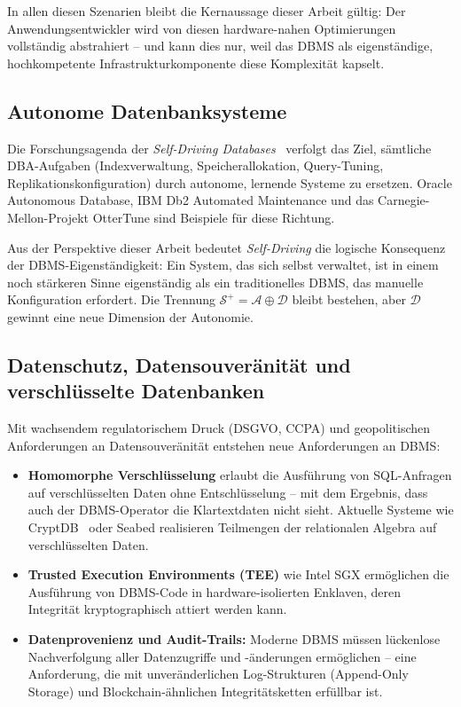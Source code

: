 ﻿\documentclass[a4paper,12pt]{article}
\theoremstyle{definition}
\begin{document}
In allen diesen Szenarien bleibt die Kernaussage dieser Arbeit gültig: Der Anwendungsentwickler wird von diesen hardware-nahen Optimierungen vollständig abstrahiert -- und kann dies nur, weil das DBMS als eigenständige, hochkompetente Infrastrukturkomponente diese Komplexität kapselt.

\subsection{Autonome Datenbanksysteme}

Die Forschungsagenda der \emph{Self-Driving Databases}~\cite{pavlo2017selfdriving} verfolgt das Ziel, sämtliche DBA-Aufgaben (Indexverwaltung, Speicherallokation, Query-Tuning, Replikationskonfiguration) durch autonome, lernende Systeme zu ersetzen. Oracle Autonomous Database, IBM Db2 Automated Maintenance und das Carnegie-Mellon-Projekt OtterTune sind Beispiele für diese Richtung.

Aus der Perspektive dieser Arbeit bedeutet \emph{Self-Driving} die logische Konsequenz der DBMS-Eigenständigkeit: Ein System, das sich selbst verwaltet, ist in einem noch stärkeren Sinne eigenständig als ein traditionelles DBMS, das manuelle Konfiguration erfordert. Die Trennung $\mathcal{S}^+ = \mathcal{A} \oplus \mathcal{D}$ bleibt bestehen, aber $\mathcal{D}$ gewinnt eine neue Dimension der Autonomie.

\subsection{Datenschutz, Datensouveränität und verschlüsselte Datenbanken}

Mit wachsendem regulatorischem Druck (DSGVO, CCPA) und geopolitischen Anforderungen an Datensouveränität entstehen neue Anforderungen an DBMS:

\begin{itemize}
	\item \textbf{Homomorphe Verschlüsselung} erlaubt die Ausführung von SQL-Anfragen auf verschlüsselten Daten ohne Entschlüsselung -- mit dem Ergebnis, dass auch der DBMS-Operator die Klartextdaten nicht sieht. Aktuelle Systeme wie CryptDB~\cite{popa2011cryptdb} oder Seabed realisieren Teilmengen der relationalen Algebra auf verschlüsselten Daten.
	\item \textbf{Trusted Execution Environments (TEE)} wie Intel SGX ermöglichen die Ausführung von DBMS-Code in hardware-isolierten Enklaven, deren Integrität kryptographisch attiert werden kann.
	\item \textbf{Datenprovenienz und Audit-Trails:} Moderne DBMS müssen lückenlose Nachverfolgung aller Datenzugriffe und -änderungen ermöglichen -- eine Anforderung, die mit unveränderlichen Log-Strukturen (Append-Only Storage) und Blockchain-ähnlichen Integritätsketten erfüllbar ist.
\end{itemize}
\end{document}
